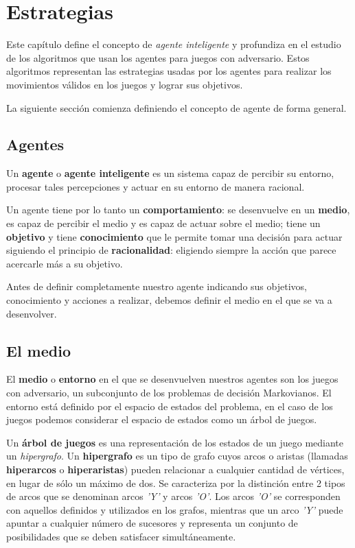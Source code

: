 \chapter{Estrategias}
\label{cap:estrategias}
Este capítulo define el concepto de \textit{agente inteligente} y profundiza en el estudio de los algoritmos que usan los agentes para juegos con adversario.
Estos algoritmos representan las estrategias usadas por los agentes para realizar los movimientos válidos en los juegos y lograr sus objetivos.

\bigskip
La siguiente sección comienza definiendo el concepto de agente de forma general.

\section{Agentes}
\label{sec:agentes}
Un \textbf{agente} o \textbf{agente inteligente} es un sistema capaz de percibir su entorno, procesar tales percepciones y actuar en su entorno de manera racional.

Un agente tiene por lo tanto un \textbf{comportamiento}: se desenvuelve en un \textbf{medio}, es capaz de percibir el medio y es capaz de actuar sobre el medio; tiene un \textbf{objetivo} y tiene \textbf{conocimiento} que le permite tomar una decisión %
para actuar siguiendo el principio de \textbf{racionalidad}: eligiendo siempre la acción que parece acercarle más a su objetivo.

\bigskip
Antes de definir completamente nuestro agente indicando sus objetivos, conocimiento y acciones a realizar, debemos definir el medio en el que se va a desenvolver.
\section{El medio}
\label{sec:el_medio}
El \textbf{medio} o \textbf{entorno} en el que se desenvuelven nuestros agentes son los juegos con adversario, un subconjunto de los problemas de decisión Markovianos.
El entorno está definido por el espacio de estados del problema, en el caso de los juegos podemos considerar el espacio de estados como un árbol de juegos.

Un \textbf{árbol de juegos} es una representación de los estados de un juego mediante un \textit{hipergrafo}.
Un \textbf{hipergrafo} es un tipo de grafo cuyos arcos o aristas (llamadas \textbf{hiperarcos} o \textbf{hiperaristas}) pueden relacionar a cualquier cantidad de vértices, en lugar de sólo un máximo de dos.
Se caracteriza por la distinción entre 2 tipos de arcos que se denominan arcos \textit{'Y'} y arcos \textit{'O'}.
Los arcos \textit{'O'} se corresponden con aquellos definidos y utilizados en los grafos, mientras que un arco \textit{'Y'} puede apuntar a cualquier número de sucesores y representa un conjunto de posibilidades que se deben satisfacer simultáneamente.

